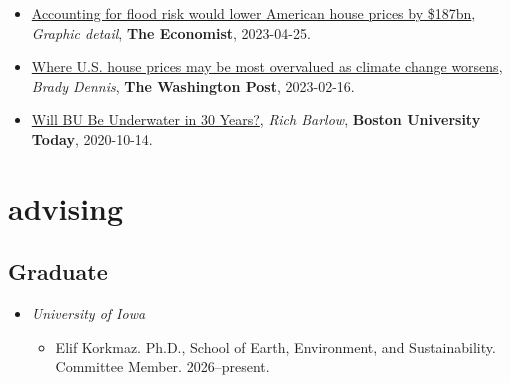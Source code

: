 \documentclass[10pt,oneside]{article}
\begin{document}
\begin{itemize}[label={}]
  \item \href{https://www.economist.com/graphic-detail/2023/04/25/accounting-for-flood-risk-would-lower-american-house-prices-by-187bn}{Accounting for flood risk would lower American house prices by \$187bn}, \textit{Graphic detail}, \textbf{The Economist}, 2023-04-25.
        
  \item \href{https://www.washingtonpost.com/climate-environment/2023/02/16/flood-risk-housing-market-property-value/}{Where U.S. house prices may be most overvalued as climate change worsens}, \textit{Brady Dennis}, \textbf{The Washington Post}, 2023-02-16.
        
  \item \href{https://www.bu.edu/articles/2020/will-bu-be-underwater-in-30-years-climate-change/}{Will BU Be Underwater in 30 Years?}, \textit{Rich Barlow}, \textbf{Boston University Today}, 2020-10-14.
        
\end{itemize}


\section{advising}

\mbox{}\vspace{-\dimexpr\baselineskip\relax}





\subsection{\normalfont\bfseries Graduate}

\begin{itemize}[label={}, leftmargin=1.5em, nosep, noitemsep]



  \item \textit{University of Iowa}

  \begin{itemize}[label={}, leftmargin=1.5em, nosep, noitemsep]

    

      
      \item Elif Korkmaz. Ph.D., School of Earth, Environment, and Sustainability. Committee Member. 2026--present.  
      

    

  \end{itemize}



\end{itemize}
\end{document}
